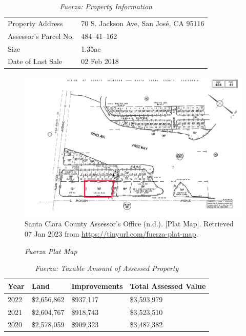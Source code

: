 \begin{table}[htb]
  \SingleSpacing%
  \caption[Fuerza: Property Information]{\textit{Fuerza: Property Information}}\label{tab:fuerza-prop-info}
  \begin{tabular}{ll}
    \toprule
    Property Address      & 70 S. Jackson Ave, San José, CA 95116 \\
    Assessor's Parcel No. & 484–41–162 \\
    Size                  & 1.35ac \\
    Date of Last Sale     & 02 Feb 2018 \\
    \bottomrule
  \end{tabular}
\end{table}

\begin{figure}[hbt]
    \caption[Fuerza Plat Map]{\textit{Fuerza Plat Map}}\label{fig:fuerza-plat-map}
    \includegraphics[width=\textwidth]{Assessor-Info/fuerza-plat-map-484-41}\\ %
    \footnotesize{Santa Clara County Assessor's Office (n.d.). [Plat Map]. Retrieved 07 Jan 2023 from  \url{https://tinyurl.com/fuerza-plat-map}}.
\end{figure}

\begin{table}[hbt]
  \SingleSpacing%
  \caption[Fuerza: Taxable Amount of Assessed Propery]{\textit{Fuerza: Taxable Amount of Assessed Property}}\label{tab:fuerza-taxable-amount}
  \begin{tabular}{llll}
    \toprule
    Year & Land        & Improvements & Total Assessed Value \\
    \midrule
    2022 & \$2,656,862 & \$937,117    & \$3,593,979 \\
    2021 & \$2,604,767 & \$918,743    & \$3,523,510 \\
    2020 & \$2,578,059 & \$909,323    & \$3,487,382 \\
    \bottomrule
  \end{tabular}
\end{table}

